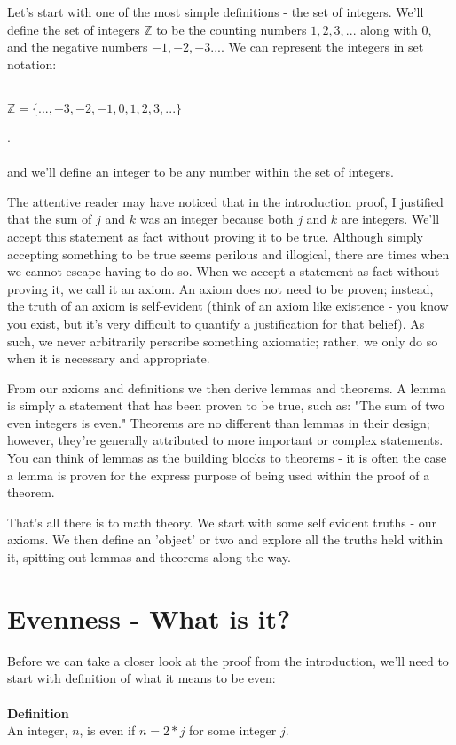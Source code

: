 \documentclass[a4paper,12pt]{article}
\begin{document}
Let's start with one of the most simple definitions - the set of integers. We'll define the set of integers $\mathbb{Z}$ to be the counting numbers $1, 2, 3, ...$ along with $0$, and the negative numbers ${-}1, {-}2, {-}3 ...$. We can represent the integers in set notation: \\
\\
\centerline{$\mathbb{Z} = \{ ..., {-3}, {-2}, {-1}, 0, 1, 2, 3, ... \}$}. \\
\\
and we'll define an integer to be any number within the set of integers.

The attentive reader may have noticed that in the introduction proof, I justified that the sum of $j$ and $k$ was an integer because both $j$ and $k$ are integers. We'll accept this statement as fact without proving it to be true. Although simply accepting something to be true seems perilous and illogical, there are times when we cannot escape having to do so. When we accept a statement as fact without proving it, we call it an axiom. An axiom does not need to be proven; instead, the truth of an axiom is self-evident (think of an axiom like existence - you know you exist, but it's very difficult to quantify a justification for that belief). As such, we never arbitrarily perscribe something axiomatic; rather, we only do so when it is necessary and appropriate.  

From our axioms and definitions we then derive lemmas and theorems. A lemma is simply a statement that has been proven to be true, such as: "The sum of two even integers is even." Theorems are no different than lemmas in their design; however, they're generally attributed to more important or complex statements. You can think of lemmas as the building blocks to theorems - it is often the case a lemma is proven for the express purpose of being used within the proof of a theorem. 

That's all there is to math theory. We start with some self evident truths - our axioms. We then define an 'object' or two and explore all the truths held within it, spitting out lemmas and theorems along the way. 

\section{Evenness - What is it?}
Before we can take a closer look at the proof from the introduction, we'll need to start with definition of what it means to be even: \\
\\
\textbf{Definition} \\
An integer, $n$, is even if $n = 2*j$ for some integer $j$. \\
\end{document}
